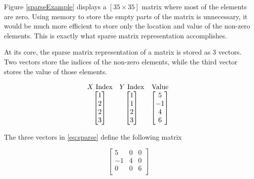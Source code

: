 \documentclass[authoryearcitations]{UoYCSproject}
\begin{document}
Figure \ref{sparseExample} displays a $[35 \times 35]$ matrix where most of the elements are zero. Using memory
to store the empty parts of the matrix is unnecessary, it would be much more efficient to store only the location 
and value of the non-zero elements. This is exactly what sparse matrix representation accomplishes. 

At its core, the sparse matrix representation of a matrix is stored as 3 vectors. Two vectors store the 
indices of the non-zero elements, while the third vector stores the value of those elements. 

\begin{equation}
\begin{array}{c c c}
X\text{ Index} & Y\text{ Index} & \text{Value} \\
\begin{bmatrix} 
                1 \\
                2 \\
                2 \\
                3 \\ \end{bmatrix} & \begin{bmatrix}          
                                           1 \\
                                           1 \\
                                           2 \\
                                           3 \\ \end{bmatrix} & \begin{bmatrix}
                                                                        5 \\
                                                                        -1 \\
                                                                         4 \\
                                                                          6 \\
                                                                \end{bmatrix}
\end{array}
\label{eq:sparse}
\end{equation}

The three vectors in \ref{eq:sparse} define the following matrix

\begin{equation}
\begin{bmatrix}
5   & 0  & 0 \\ 
-1  & 4  & 0 \\
 0  & 0  & 6 \\
\end{bmatrix}
\end{equation}
\end{document}
